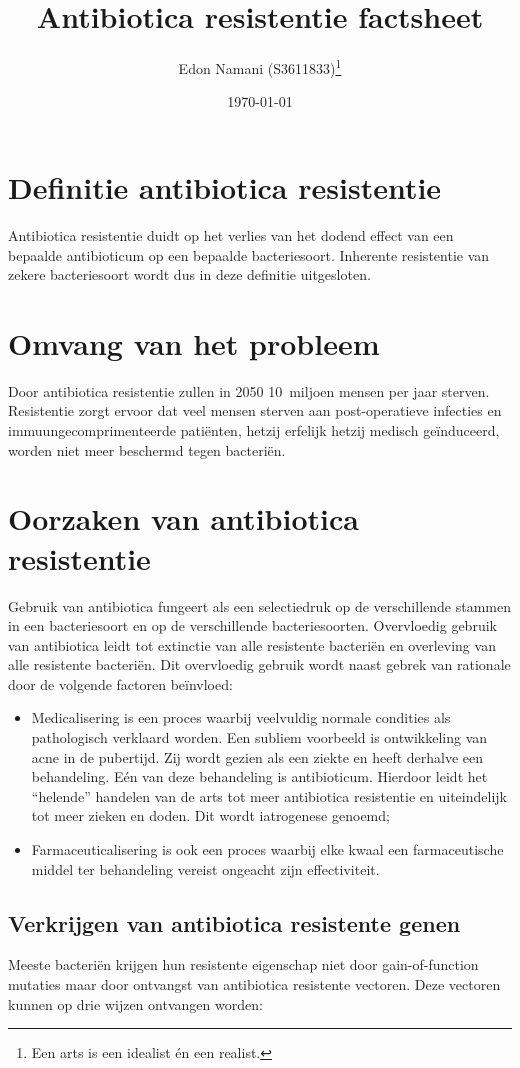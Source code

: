 \documentclass[twocolumn]{scrartcl}
\title{Antibiotica resistentie factsheet}
\author{Edon Namani (S3611833)\thanks{Een arts is een idealist én een realist.}}
\date{\today}
\begin{document}
\maketitle
\section*{Definitie antibiotica resistentie}
Antibiotica resistentie duidt op het verlies van het dodend effect van een bepaalde antibioticum op een bepaalde bacteriesoort. Inherente resistentie van zekere bacteriesoort wordt dus in deze definitie uitgesloten.
\section*{Omvang van het probleem}
Door antibiotica resistentie zullen in 2050 10~miljoen mensen per jaar sterven. Resistentie zorgt ervoor dat veel mensen sterven aan post-operatieve infecties en immuungecomprimenteerde patiënten, hetzij erfelijk hetzij medisch geïnduceerd, worden niet meer beschermd tegen bacteriën.
\section*{Oorzaken van antibiotica resistentie}
Gebruik van antibiotica fungeert als een selectiedruk op de verschillende stammen in een bacteriesoort en op de verschillende bacteriesoorten. Overvloedig gebruik van antibiotica leidt tot extinctie van alle resistente bacteriën en overleving van alle resistente bacteriën. Dit overvloedig gebruik wordt naast gebrek van rationale door de volgende factoren beïnvloed:

\begin{itemize}
    \item Medicalisering is een proces waarbij veelvuldig normale condities als pathologisch verklaard worden. Een subliem voorbeeld is ontwikkeling van acne in de pubertijd. Zij wordt gezien als een ziekte en heeft derhalve een behandeling. Eén van deze behandeling is antibioticum. Hierdoor leidt het ``helende'' handelen van de arts tot meer antibiotica resistentie en uiteindelijk tot meer zieken en doden. Dit wordt iatrogenese genoemd;
    \item Farmaceuticalisering is ook een proces waarbij elke kwaal een farmaceutische middel ter behandeling vereist ongeacht zijn effectiviteit.
\end{itemize}

\subsection*{Verkrijgen van antibiotica resistente genen}
Meeste bacteriën krijgen hun resistente eigenschap niet door gain-of-function mutaties maar door ontvangst van antibiotica resistente vectoren. Deze vectoren kunnen op drie wijzen ontvangen worden:
\end{document}
